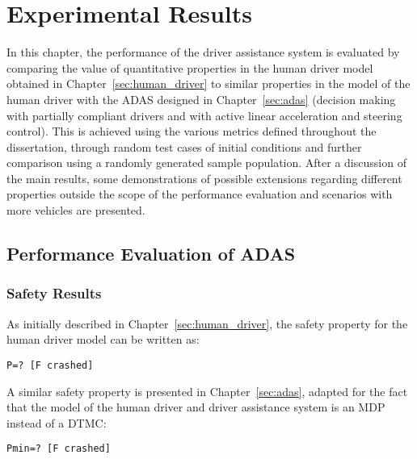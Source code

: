 \chapter{Experimental Results}
\label{sec:results}

In this chapter, the performance of the driver assistance system is evaluated by comparing the value of quantitative properties in the human driver model obtained in Chapter~\ref{sec:human_driver} to similar properties in the model of the human driver with the ADAS designed in Chapter~\ref{sec:adas} (decision making with partially compliant drivers and with active linear acceleration and steering control). This is achieved using the various metrics defined throughout the dissertation, through random test cases of initial conditions and further comparison using a randomly generated sample population. After a discussion of the main results, some demonstrations of possible extensions regarding different properties outside the scope of the performance evaluation and scenarios with more vehicles are presented.

\section{Performance Evaluation of ADAS}


\subsection{Safety Results}
\label{sec:res_safety}

As initially described in Chapter~\ref{sec:human_driver}, the safety property for the human driver model can be written as:

\begin{minipage}{\linewidth}
{\vspace{1em}
\begin{lstlisting}
P=? [F crashed]
\end{lstlisting}
}
\end{minipage}

A similar safety property is presented in Chapter~\ref{sec:adas}, adapted for the fact that the model of the human driver and driver assistance system is an MDP instead of a DTMC:

\begin{minipage}{\linewidth}
{\vspace{1em}
\begin{lstlisting}
Pmin=? [F crashed]
\end{lstlisting}
}
\end{minipage}

